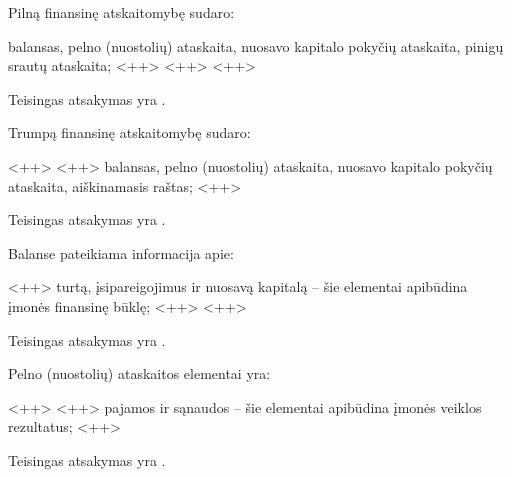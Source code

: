 \begin{tasks}
  \begin{task}
    \begin{condition}
      Pilną finansinę atskaitomybę sudaro:
      \begin{enumerate}
         balansas, pelno (nuostolių) ataskaita, nuosavo
          kapitalo pokyčių ataskaita, pinigų srautų ataskaita;
         <++>
         <++>
         <++>
      \end{enumerate}
    \end{condition}
    \begin{solution}
      Teisingas atsakymas yra .
    \end{solution}
  \end{task}

  \begin{task}
    \begin{condition}
      Trumpą finansinę atskaitomybę sudaro:
      \begin{enumerate}
         <++>
         <++>
         balansas, pelno (nuostolių) ataskaita, nuosavo
          kapitalo pokyčių ataskaita, aiškinamasis raštas;
         <++>
      \end{enumerate}
    \end{condition}
    \begin{solution}
      Teisingas atsakymas yra .
    \end{solution}
  \end{task}

  \begin{task}
    \begin{condition}
      Balanse pateikiama informacija apie:
      \begin{enumerate}
         <++>
         turtą, įsipareigojimus ir nuosavą kapitalą –
          šie elementai apibūdina įmonės finansinę būklę;
         <++>
         <++>
      \end{enumerate}
    \end{condition}
    \begin{solution}
      Teisingas atsakymas yra .
    \end{solution}
  \end{task}

  \begin{task}
    \begin{condition}
      Pelno (nuostolių) ataskaitos elementai yra:
      \begin{enumerate}
         <++>
         <++>
         pajamos ir sąnaudos – šie elementai apibūdina įmonės
          veiklos rezultatus;
         <++>
      \end{enumerate}
    \end{condition}
    \begin{solution}
      Teisingas atsakymas yra .
    \end{solution}
  \end{task}


\end{tasks}
